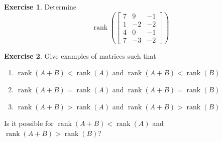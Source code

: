 \documentclass{beamer}
\newcommand{\fn}{\insertframenumber}
\newcommand{\rank}{\operatorname{rank}}
\theoremstyle{definition}
\newtheorem{exercise}{Exercise}
\begin{document}
\begin{frame}{\fn}
	\begin{exercise}
		Determine
		\[\rank\left(\begin{bmatrix}
		7 & 9 & -1 \\
		1 & -2 & -2 \\
		4 & 0 & -1 \\
		7 & -3 & -2
		\end{bmatrix}\right)\]
	\end{exercise}
\end{frame}
\begin{frame}{\fn}
	\begin{exercise}
		Give examples of matrices such that\begin{enumerate}[label=(\alph*)]
			\item $\rank(A+B)<\rank(A)$ and $\rank(A+B)<\rank(B)$
			\item $\rank(A+B)=\rank(A)$ and $\rank(A+B)=\rank(B)$
			\item $\rank(A+B)>\rank(A)$ and $\rank(A+B)>\rank(B)$
		\end{enumerate}
		Is it possible for $\rank(A+B)<\rank(A)$ and $\rank(A+B)>\rank(B)$?
	\end{exercise}
\end{frame}
\end{document}
